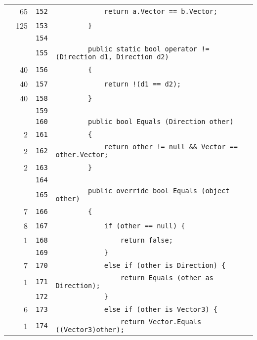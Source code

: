 \documentclass[a4paper,10pt]{article}
\begin{document}
\begin{longtable}[l]{lrrl}
\cellcolor{green} & 65 & \verb~152~ & \verb~            return a.Vector == b.Vector;~\\
\cellcolor{green} & 125 & \verb~153~ & \verb~        }~\\
\cellcolor{gray} &  & \verb~154~ & \verb~~\\
\cellcolor{gray} &  & \verb~155~ & \verb~        public static bool operator != (Direction d1, Direction d2)~\\
\cellcolor{green} & 40 & \verb~156~ & \verb~        {~\\
\cellcolor{green} & 40 & \verb~157~ & \verb~            return !(d1 == d2);~\\
\cellcolor{green} & 40 & \verb~158~ & \verb~        }~\\
\cellcolor{gray} &  & \verb~159~ & \verb~~\\
\cellcolor{gray} &  & \verb~160~ & \verb~        public bool Equals (Direction other)~\\
\cellcolor{green} & 2 & \verb~161~ & \verb~        {~\\
\cellcolor{green} & 2 & \verb~162~ & \verb~            return other != null && Vector == other.Vector;~\\
\cellcolor{green} & 2 & \verb~163~ & \verb~        }~\\
\cellcolor{gray} &  & \verb~164~ & \verb~~\\
\cellcolor{gray} &  & \verb~165~ & \verb~        public override bool Equals (object other)~\\
\cellcolor{green} & 7 & \verb~166~ & \verb~        {~\\
\cellcolor{green} & 8 & \verb~167~ & \verb~            if (other == null) {~\\
\cellcolor{green} & 1 & \verb~168~ & \verb~                return false;~\\
\cellcolor{gray} &  & \verb~169~ & \verb~            }~\\
\cellcolor{green} & 7 & \verb~170~ & \verb~            else if (other is Direction) {~\\
\cellcolor{green} & 1 & \verb~171~ & \verb~                return Equals (other as Direction);~\\
\cellcolor{gray} &  & \verb~172~ & \verb~            }~\\
\cellcolor{green} & 6 & \verb~173~ & \verb~            else if (other is Vector3) {~\\
\cellcolor{green} & 1 & \verb~174~ & \verb~                return Vector.Equals ((Vector3)other);~\\

\end{longtable}
\end{document}
